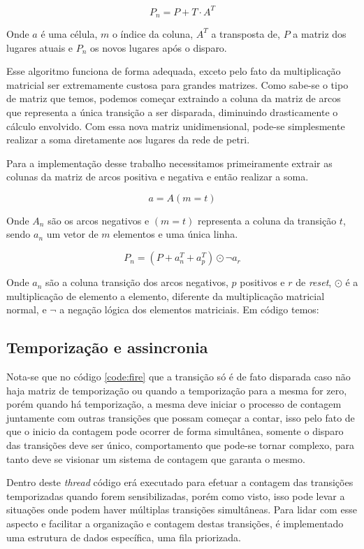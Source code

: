 $$
P_n = P + T \cdot A^T
$$

Onde $a$ é uma célula, $m$ o índice da coluna, $A^T$ a transposta de, $P$ a matriz dos lugares atuais e $P_n$ os novos lugares após o disparo.

Esse algoritmo funciona de forma adequada, exceto pelo fato da multiplicação matricial ser extremamente custosa para grandes matrizes. Como sabe-se o tipo de matriz que temos, podemos começar extraindo a coluna da matriz de arcos que representa a única transição a ser disparada, diminuindo drasticamente o cálculo envolvido. Com essa nova matriz unidimensional, pode-se simplesmente realizar a soma diretamente aos lugares da rede de petri. 

Para a implementação desse trabalho necessitamos primeiramente extrair as colunas da matriz de arcos positiva e negativa e então realizar a soma.

$$
a = A(m=t)
$$

Onde $A_n$ são os arcos negativos e $(m=t)$ representa a coluna da transição $t$, sendo $a_n$ um vetor de $m$ elementos e uma única linha.

$$
P_n = \left(P + a_n^T + a_p^T\right) \odot \neg a_r
$$

Onde $a_n$ são a coluna transição dos arcos negativos, $p$ positivos e $r$ de \textit{reset}, $\odot$ é a multiplicação de elemento a elemento, diferente da multiplicação matricial normal, e $\neg$ a negação lógica dos elementos matriciais. Em código temos:



\subsection{Temporização e assincronia}

Nota-se que no código \ref{code:fire} que a transição só é de fato disparada caso não haja matriz de temporização ou quando a temporização para a mesma for zero, porém quando há temporização, a mesma deve iniciar o processo de contagem juntamente com outras transições que possam começar a contar, isso pelo fato de que o inicio da contagem pode ocorrer de forma simultânea, somente o disparo das transições deve ser único, comportamento que pode-se tornar complexo, para tanto deve se visionar um sistema de contagem que garanta o mesmo.

Dentro deste \textit{thread} código erá executado para efetuar a contagem das transições temporizadas quando forem sensibilizadas, porém como visto, isso pode levar a situações onde podem haver múltiplas transições simultâneas. Para lidar com esse aspecto e facilitar a organização e contagem destas transições, é implementado uma estrutura de dados específica, uma fila priorizada. 

